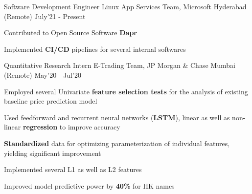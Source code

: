 \begin{cventries}

  \cventry
  {Software Development Engineer}
  {Linux App Services Team, Microsoft}
  {Hyderabad (Remote)}
  {July'21 - Present}
  {
    \begin{cvitems}
      \item Contributed to Open Source Software \textbf{Dapr} 
      \item Implemented \textbf{CI/CD} pipelines for several internal softwares
    \end{cvitems}
  }
  \cventry
  {Quantitative Research Intern}
  {E-Trading Team, JP Morgan \& Chase}
  {Mumbai (Remote)}
  {May'20 - Jul'20}
  {
    \begin{cvitems}
      \item Employed several Univariate \textbf{feature selection tests} for the analysis of existing baseline price prediction model
      \item Used feedforward and recurrent neural networks (\textbf{LSTM}), linear as well as non-linear \textbf{regression} to improve accuracy
      \item	\textbf{Standardized} data for optimizing parameterization of individual features, yielding significant improvement
      \item Implemented several L1 as well as L2 features
      \item Improved model predictive power by \textbf{40\%} for HK names
    \end{cvitems}
  }

\end{cventries}
\vspace{-2mm}

